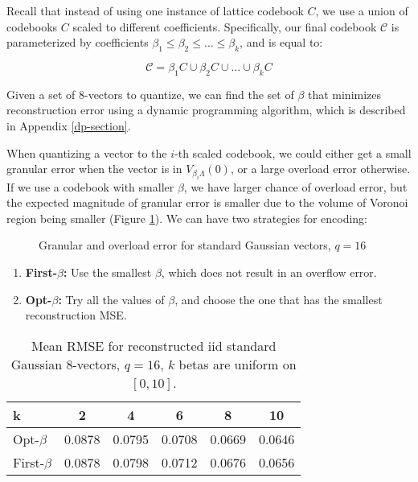 Recall that instead of using one instance of lattice codebook $C$, we use a union of codebooks $C$ scaled to different coefficients. Specifically, our final codebook $\mathcal{C}$ is parameterized by coefficients $\beta_1 \le \beta_2 \le \ldots \le \beta_k$, and is equal to:

\[
    \mathcal{C} = \beta_1 C \cup \beta_2 C \cup \ldots \cup \beta_k C
\]

Given a set of 8-vectors to quantize, we can find the set of $\beta$ that minimizes reconstruction error using a dynamic programming algorithm, which is described in Appendix \ref{dp-section}.

When quantizing a vector to the $i$-th scaled codebook, we could either get a small granular error when the vector is in $V_{\beta_i\Lambda}(0)$, or a large overload error otherwise. If we use a codebook with smaller $\beta$, we have larger chance of overload error, but the expected magnitude of granular error is smaller due to the volume of Voronoi region being smaller (Figure \ref{err}). We can have two strategies for encoding:

\begin{figure}[H]\label{fig:overload_and_granular}
\centering
{}
\caption{Granular and overload error for standard Gaussian vectors, $q=16$}
\label{err}
\end{figure}

\begin{enumerate}
    \item \textbf{First-$\beta$:} Use the smallest $\beta$, which does not result in an overflow error.
    \item \textbf{Opt-$\beta$:} Try all the values of $\beta$, and choose the one that has the smallest reconstruction MSE.
\end{enumerate}

\begin{table}[h]
\label{rmse-beta}
\vskip 0.15in
\begin{center}
\begin{small}
\begin{sc}
\begin{tabular}{lccccc}
\toprule
k & 2& 4& 6& 8& 10 \\
\midrule
Opt-$\beta$& 0.0878& 0.0795& 0.0708& 0.0669& 0.0646 \\
First-$\beta$& 0.0878& 0.0798& 0.0712& 0.0676& 0.0656 \\
\bottomrule
\end{tabular}
\end{sc}
\end{small}
\end{center}
\ifisicml\else\vspace{1em}\fi
\caption{Mean RMSE for reconstructed iid standard Gaussian 8-vectors, $q=16$, $k$ betas are uniform on $[0, 10]$.}
\end{table}

